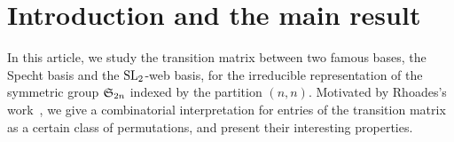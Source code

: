 %

\section{Introduction and the main result}
In this article, we study the transition matrix between two famous bases,
the Specht basis and the \( \operatorname{SL}_2 \)-web basis, for the irreducible representation
of the symmetric group \( \mathfrak{S}_{2n} \) indexed by the partition \( (n,n) \).
Motivated by Rhoades's work~\cite{Rho19}, we give a combinatorial interpretation
for entries of the transition matrix as a certain class of permutations,
and present their interesting properties.




